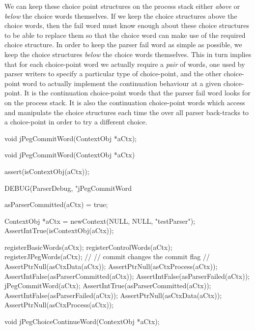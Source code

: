 We can keep these choice point structures on the process stack either 
\emph{above} or \emph{below} the choice words themselves. If we keep the 
choice structures above the choice words, then the fail word must know 
enough about these choice structures to be able to replace them so that 
the choice word can make use of the required choice structure. In order to 
keep the parser fail word as simple as possible, we keep the choice 
structures \emph{below} the choice words themselves. This in turn implies 
that for each choice-point word we actually require a \emph{pair} of 
words, one used by parser writers to specify a particular type of 
choice-point, and the other  choice-point word to 
actually implement the continuation behaviour at a given choice-point. It 
is the continuation choice-point words that the parser fail word looks for 
on the process stack. It is also the continuation choice-point words which 
access and manipulate the choice structures each time the over all parser 
back-tracks to a choice-point in order to try a different choice. 

\startTestSuite[jPegCommitWord]

\startCHeader
void jPegCommitWord(ContextObj *aCtx);
\stopCHeader

\startCCode
void jPegCommitWord(ContextObj *aCtx) {
  assert(isContextObj(aCtx));

  DEBUG(ParserDebug, "jPegCommitWord%
  
  asParserCommitted(aCtx) = true;
}
\stopCCode


\startCTest
  ContextObj *aCtx = newContext(NULL, NULL, "testParser");
  AssertIntTrue(isContextObj(aCtx));
  
  registerBasicWords(aCtx);
  registerControlWords(aCtx);
  registerJPegWords(aCtx);
  //
  // commit changes the commit flag
  //
  AssertPtrNull(asCtxData(aCtx));
  AssertPtrNull(asCtxProcess(aCtx));
  AssertIntFalse(asParserCommitted(aCtx));
  AssertIntFalse(asParserFailed(aCtx));
  jPegCommitWord(aCtx);
  AssertIntTrue(asParserCommitted(aCtx));
  AssertIntFalse(asParserFailed(aCtx));
  AssertPtrNull(asCtxData(aCtx));
  AssertPtrNull(asCtxProcess(aCtx));
\stopCTest
\stopTestCase
\stopTestSuite

\startTestSuite[jPegChoiceContinueWord]

\startCHeader
void jPegChoiceContinueWord(ContextObj *aCtx);
\stopCHeader

